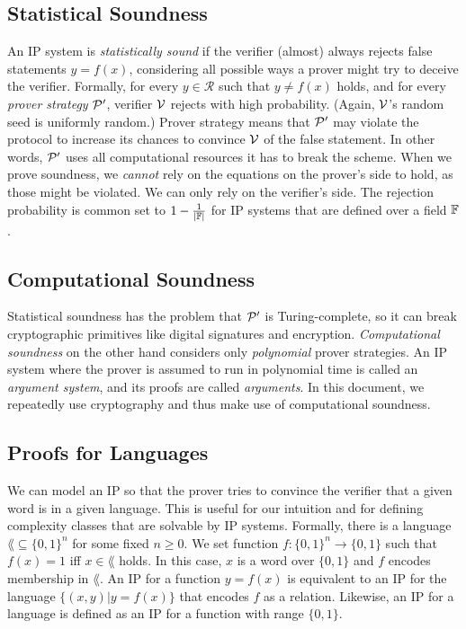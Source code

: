 \subsection{Statistical Soundness}%
\label{sub:statistical-soundness}

An IP system is \emph{statistically sound} if the verifier (almost) always rejects false statements $y = f(x)$,
considering all possible ways a prover might try to deceive the verifier.
%
Formally,
for every $y \in \mathcal{R}$ such that $y \neq f(x)$ holds,
and for every \emph{prover strategy} $\mathcal{P}'$,
verifier $\mathcal{V}$ rejects with high probability.
(Again, $\mathcal{V}$'s random seed is uniformly random.)
%
Prover strategy means that $\mathcal{P}'$ may violate the protocol to increase its chances to convince $\mathcal{V}$ of the false statement.
In other words,
$\mathcal{P}'$ uses all computational resources it has to break the scheme.
When we prove soundness,
we \emph{cannot} rely on the equations on the prover's side to hold,
as those might be violated.
We can only rely on the verifier's side.
%
The rejection probability is common set to $1 - \frac{1}{|\mathbb{F}|}$
for IP systems that are defined over a field $\mathbb{F}$.

\subsection{Computational Soundness}

Statistical soundness has the problem that $\mathcal{P}'$ is Turing-complete,
so it can break cryptographic primitives like digital signatures and encryption.
\emph{Computational soundness} on the other hand considers only \emph{polynomial} prover strategies.
%
An IP system where the prover is assumed to run in polynomial time is called an \emph{argument system},
and its proofs are called \emph{arguments}.
%
In this document,
we repeatedly use cryptography and thus make use of computational soundness.

\subsection{Proofs for Languages}

We can model an IP so that the prover tries to convince the verifier that a given word is in a given language.
This is useful for our intuition and
for defining complexity classes that are solvable by IP systems.
%
Formally,
there is a language $\lang \subseteq \{ 0, 1 \}^n$ for some fixed $n \geq 0$.
We set function $f: \{ 0, 1 \}^n \to \{ 0, 1 \}$ such that $f(x) = 1$ iff $x \in \lang$ holds.
In this case, $x$ is a word over $\{ 0, 1 \}$ and $f$ encodes membership in $\lang$.
%
An IP for a function $y = f(x)$ is equivalent to an IP for the language $\{ (x, y) \vert y = f(x) \}$ that encodes $f$ as a relation.
Likewise, an IP for a language is defined as an IP for a function with range $\{ 0, 1 \}$.

